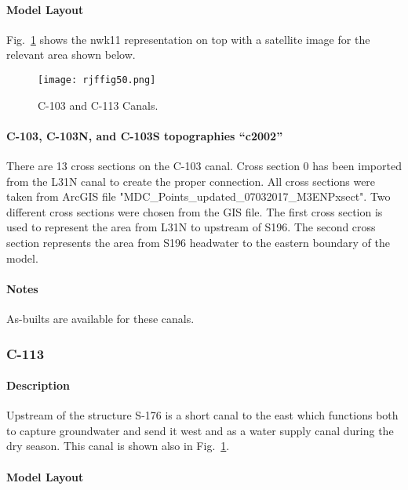 \paragraph{Model Layout}
Fig.~\ref{fig:rjffig50} shows the nwk11 representation on top with a satellite image for the relevant area shown below.


\begin{figure}[!h]
  \begin{center}
  \texttt{[image: rjffig50.png]}
  \caption{C-103 and C-113 Canals.}
  \label{fig:rjffig50}
  \end{center}
\end{figure}


\paragraph{C-103, C-103N, and C-103S topographies ``c2002''}
There are 13 cross sections on the C-103 canal.  Cross section 0 has been imported from the L31N canal to create the proper connection.  All cross sections were taken from ArcGIS file "MDC\_Points\_updated\_07032017\_M3ENPxsect".  Two different cross sections were chosen from the GIS file.  The first cross section is used to represent the area from L31N to upstream of S196.  The second cross section represents the area from S196 headwater to the eastern boundary of the model.

\begin{notes}
\paragraph{Notes}
As-builts are available for these canals.
\end{notes}


\clearpage
\subsubsection{C-113}
\paragraph{Description}
Upstream of the structure S-176 is a short canal to the east which functions both to capture groundwater and send it west and as a water supply canal during the dry season. This canal is shown also in Fig.~\ref{fig:rjffig50}.

\paragraph{Model Layout}


